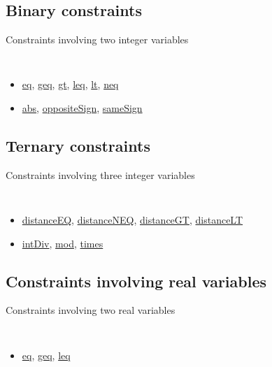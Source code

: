 \subsection{Binary constraints}\label{model:comparisonconstraints}\hypertarget{model:comparisonconstraints}{}
Constraints involving two integer variables
\begin{notedef}\tt
  \begin{itemize}
  \item \hyperlink{eq:eqconstraint}{eq}, \hyperlink{geq:geqconstraint}{geq}, \hyperlink{gt:gtconstraint}{gt}, \hyperlink{leq:leqconstraint}{leq}, \hyperlink{lt:ltconstraint}{lt}, \hyperlink{neq:neqconstraint}{neq}
  \item \hyperlink{abs:absconstraint}{abs}, \hyperlink{oppositesign:oppositesignconstraint}{oppositeSign}, \hyperlink{samesign:samesignconstraint}{sameSign}
  \end{itemize}
\end{notedef}

\subsection{Ternary constraints}\label{model:ternaryconstraints}\hypertarget{model:ternaryconstraints}{}
Constraints involving three integer variables
\begin{notedef}\tt
  \begin{itemize}
  \item \hyperlink{distanceeq:distanceeqconstraint}{distanceEQ}, \hyperlink{distanceneq:distanceneqconstraint}{distanceNEQ}, \hyperlink{distancegt:distancegtconstraint}{distanceGT}, \hyperlink{distancelt:distanceltconstraint}{distanceLT}
  \item \hyperlink{intdiv:intdivconstraint}{intDiv}, \hyperlink{mod:modconstraint}{mod}, \hyperlink{times:timesconstraint}{times}
  \end{itemize}
\end{notedef}

\subsection{Constraints involving real variables}\label{model:realconstraints}\hypertarget{model:realconstraints}{}
Constraints involving two real variables
\begin{notedef}\tt
  \begin{itemize}
  \item \hyperlink{eq:eqconstraint}{eq}, \hyperlink{geq:geqconstraint}{geq}, \hyperlink{leq:leqconstraint}{leq}
  \end{itemize}
\end{notedef}

